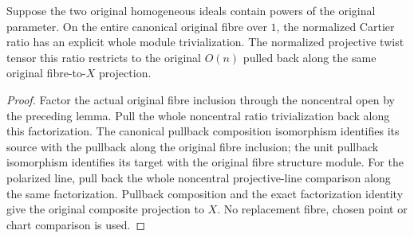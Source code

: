 \begin{theorem}
\label{thm:pl-original-normalized-fibre-one-line}
\leanok
{}
Suppose the two original homogeneous ideals contain powers of the original
parameter. On the entire canonical original fibre over $1$, the normalized
Cartier ratio has an explicit whole module trivialization. The normalized projective twist tensor
this ratio restricts to the original $O(n)$ pulled back along the same
original fibre-to-$X$ projection.
\end{theorem}
\begin{proof}
Factor the actual original fibre inclusion through the noncentral open by the
preceding lemma. Pull the whole noncentral ratio trivialization back along
this factorization. The canonical pullback composition isomorphism identifies
its source with the pullback along the original fibre inclusion; the unit
pullback isomorphism identifies its target with the original fibre structure
module. For the polarized line, pull back the whole noncentral projective-line
comparison along the same factorization. Pullback composition and the exact
factorization identity give the original composite projection to $X$.
No replacement fibre, chosen point or chart comparison is used.
\end{proof}

